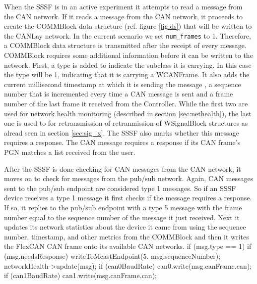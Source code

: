 \documentclass[letterpaper,twocolumn,12pt]{article}
\begin{document}
When the SSSF is in an active experiment it 
attempts to read a message from the CAN network. If it reads a message from the CAN network, it proceeds to create the COMMBlock data structure (ref. figure \ref{fig:ds}) that will be written to the CANLay network. In the current scenario we set \texttt{num\_frames} to 1. Therefore, a COMMBlock data structure is transmitted after the receipt of every message.
COMMBlock requires some additional information before it can be written to the network. 
First, a type is added to indicate the subclass it is carrying. In this case the type will be 1, indicating that it is carrying a WCANFrame. 
It also adds the current millisecond timestamp at which it is sending the message
, a sequence number that is incremented every time a CAN message is sent
and a frame number of the last frame it received from the Controller.
While the first two are used for network health monitoring (described in section \ref{sec:nethealth}), the last one is used to for retransmission of retranmission of WSignalBlock structures as alread seen in section \ref{sec:sig_x}.
The SSSF also marks whether this message requires a response. The CAN message requires a response if its CAN frame’s PGN matches a list received from the user.

After the SSSF is done checking for CAN messages from the CAN network, it moves on to check for messages from the pub/sub network. Again, CAN messages sent to the pub/sub endpoint are considered type 1 messages. So if an SSSF device receives a type 1 message it first checks if the message requires a response. If so, it replies to the pub/sub endpoint with a type 5 message with the frame number equal to the sequence number of the message it just received. Next it updates its network statistics about the device it came from using the sequence number, timestamp, and other metrics from the COMMBlock and then it writes the FlexCAN CAN frame onto its available CAN networks.
    if (msg.type == 1)
    {
        if (msg.needsResponse)
        {
            writeToMcastEndpoint(5. msg.sequenceNumber);
        }
        networkHealth->update(msg);
        if (can0BaudRate) can0.write(msg.canFrame.can);
        if (can1BaudRate) can1.write(msg.canFrame.can);
    }
\end{document}
